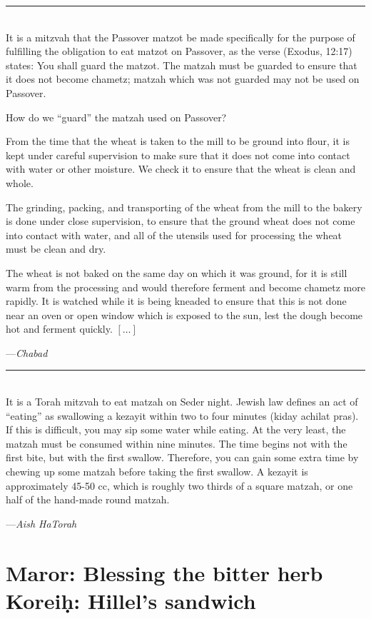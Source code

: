 \documentclass[letter,11pt,openany]{memoir}
\newcommand{\HgEllipsis}{\ensuremath{\left[\ldots\right]}}
\newcommand{\HgSource}[1]{\hfill{\small---\itshape{#1}}}
\newcommand{\HgFill}{
\vfill \hrule 
\vfill}
\newenvironment{HgEnglish}{\strut\\
\noindent}{\vspace{1em}}
\begin{document}
\HgFill
\begin{HgEnglish}
	It is a mitzvah that the Passover matzot be made specifically for the purpose of fulfilling the obligation to eat matzot on Passover, as the verse (Exodus, 12:17) states: You shall guard the matzot. The matzah must be guarded to ensure that it does not become chametz; matzah which was not guarded may not be used on Passover.
	
	How do we ``guard'' the matzah used on Passover? 
	
	From the time that the wheat is taken to the mill to be ground into flour, it is kept under careful supervision to make sure that it does not come into contact with water or other moisture. We check it to ensure that the wheat is clean and whole. 
	
	The grinding, packing, and transporting of the wheat from the mill to the bakery is done under close supervision, to ensure that the ground wheat does not come into contact with water, and all of the utensils used for processing the wheat must be clean and dry. 
	
	The wheat is not baked on the same day on which it was ground, for it is still warm from the processing and would therefore ferment and become chametz more rapidly. It is watched while it is being kneaded to ensure that this is not done near an oven or open window which is exposed to the sun, lest the dough become hot and ferment quickly. \HgEllipsis
	
	\HgSource{Chabad} 
\end{HgEnglish}

\HgFill
\begin{HgEnglish}
	It is a Torah mitzvah to eat matzah on Seder night. Jewish law defines an act of ``eating'' as swallowing a kezayit within two to four minutes (kiday achilat pras). If this is difficult, you may sip some water while eating. At the very least, the matzah must be consumed within nine minutes. The time begins not with the first bite, but with the first swallow. Therefore, you can gain some extra time by chewing up some matzah before taking the first swallow. A kezayit is approximately 45-50 cc, which is roughly two thirds of a square matzah, or one half of the hand-made round matzah.
	
	\HgSource{Aish HaTorah} 
\end{HgEnglish}

\chapter*{Maror: Blessing the bitter herb \\
Korei\d{h}: Hillel's sandwich} 
\vfill
\end{document}
